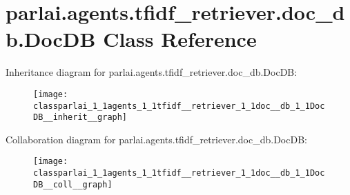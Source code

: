 \hypertarget{classparlai_1_1agents_1_1tfidf__retriever_1_1doc__db_1_1DocDB}{}\section{parlai.\+agents.\+tfidf\+\_\+retriever.\+doc\+\_\+db.\+Doc\+DB Class Reference}
\label{classparlai_1_1agents_1_1tfidf__retriever_1_1doc__db_1_1DocDB}


Inheritance diagram for parlai.\+agents.\+tfidf\+\_\+retriever.\+doc\+\_\+db.\+Doc\+DB\+:
\nopagebreak
\begin{figure}[H]
\begin{center}
\leavevmode
\texttt{[image: classparlai\_1\_1agents\_1\_1tfidf\_\_retriever\_1\_1doc\_\_db\_1\_1DocDB\_\_inherit\_\_graph]}
\end{center}
\end{figure}


Collaboration diagram for parlai.\+agents.\+tfidf\+\_\+retriever.\+doc\+\_\+db.\+Doc\+DB\+:
\nopagebreak
\begin{figure}[H]
\begin{center}
\leavevmode
\texttt{[image: classparlai\_1\_1agents\_1\_1tfidf\_\_retriever\_1\_1doc\_\_db\_1\_1DocDB\_\_coll\_\_graph]}
\end{center}
\end{figure}

